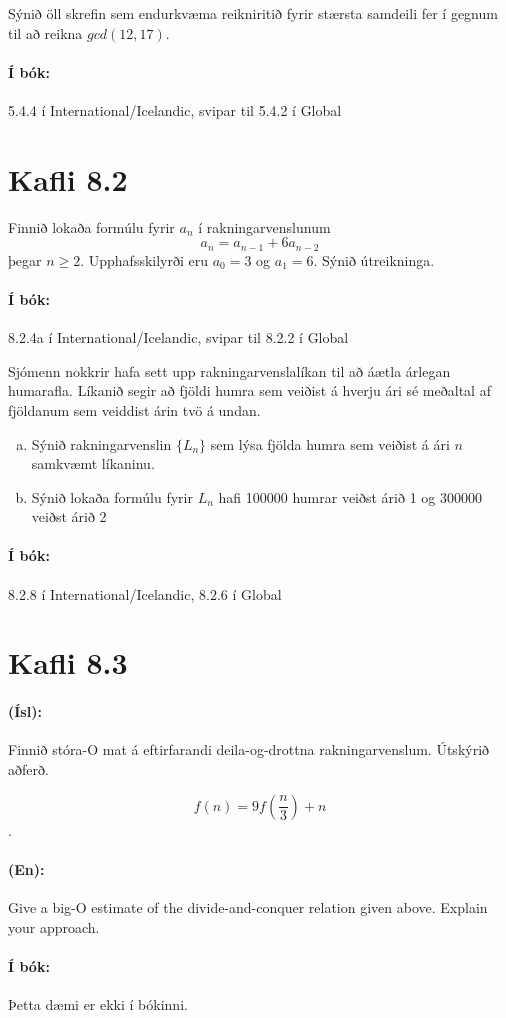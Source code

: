 \documentclass{article}
\begin{document}
\question

Sýnið öll skrefin sem endurkvæma reikniritið fyrir stærsta samdeili fer í gegnum til að reikna $gcd(12,17)$.

\paragraph{Í bók:} 5.4.4 í International/Icelandic, svipar til 5.4.2 í Global

\section{Kafli 8.2}
\question

Finnið lokaða formúlu fyrir $a_n$ í rakningarvenslunum
\[
 a_n = a_{n-1} + 6a_{n-2}
\]
þegar $n \geq 2$. Upphafsskilyrði eru $a_0 = 3$ og $a_1 = 6$. Sýnið útreikninga.

\paragraph{Í bók:} 8.2.4a í International/Icelandic, svipar til 8.2.2 í Global


\question
Sjómenn nokkrir hafa sett upp rakningarvenslalíkan til að áætla árlegan humarafla. Líkanið segir að fjöldi humra sem veiðist á hverju ári sé meðaltal af fjöldanum sem veiddist árin tvö á undan.

\begin{enumerate}[a)]
    \item Sýnið rakningarvenslin $\{L_n\}$ sem lýsa fjölda humra sem veiðist á ári $n$ samkvæmt líkaninu.
    \item Sýnið lokaða formúlu fyrir $L_n$ hafi 100000 humrar veiðst árið 1 og 300000 veiðst árið 2 
\end{enumerate}

\paragraph{Í bók:} 8.2.8 í International/Icelandic, 8.2.6 í Global

\section{Kafli 8.3}
\question 

\paragraph{(Ísl):} Finnið stóra-O mat á eftirfarandi deila-og-drottna rakningarvenslum. Útskýrið aðferð.

\[f(n) = 9f\left(\frac{n}{3}\right) + n\].

\paragraph{(En):} Give a big-O estimate of the divide-and-conquer relation given above. Explain your approach.

\paragraph{Í bók:} Þetta dæmi er ekki í bókinni.
\end{document}
